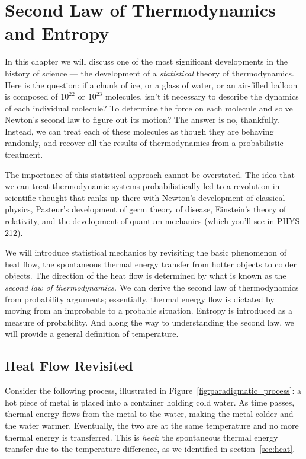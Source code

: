 \chapter{Second Law of Thermodynamics and  Entropy}
\label{chap:second_law}




In this chapter we will discuss one of the most significant
developments in the history of science --- the development of a \emph{statistical} theory of thermodynamics.  Here is the question: if a
chunk of ice, or a glass of water, or an air-filled balloon is composed of
$10^{22}$ or $10^{23}$ molecules, isn't it necessary to describe the
dynamics of each individual molecule?  To determine the force on each
molecule and solve Newton's second law to figure out its motion?  The
answer is no, thankfully.  Instead, we can treat each of these
molecules as though they are behaving randomly, and recover all the
results of thermodynamics from a probabilistic treatment.


The importance of this statistical approach cannot be overstated.
The idea that we can treat thermodynamic systems probabilistically
led to a revolution in scientific thought that ranks up there
with Newton's development of classical physics, Pasteur's development
of germ theory of disease, Einstein's theory of relativity, and
the development of quantum mechanics (which you'll see in PHYS 212).

We will introduce statistical mechanics by revisiting the basic phenomenon
of heat flow, the spontaneous thermal energy transfer from hotter objects
to colder objects.  The direction of the heat flow is determined by what
is known as the \textit{second law of thermodynamics.}  We can derive the
second law of thermodynamics from probability arguments; essentially,
thermal energy flow is dictated by moving from an improbable to a
probable situation.  Entropy is introduced as a measure of probability.
And along the way to understanding the second law, we will provide a
general definition of temperature.

\section{Heat Flow Revisited}

Consider the following process, illustrated in
Figure~\ref{fig:paradigmatic_process}: a hot piece of metal is placed
into a container holding cold water.  As time passes, thermal energy
flows from the metal to the water, making the metal colder and the
water warmer.  Eventually, the two are at the same temperature and no
more thermal energy is transferred.  This is \textit{heat}: the
spontaneous thermal energy transfer due to the temperature difference,
as we identified in section~\ref{sec:heat}.

